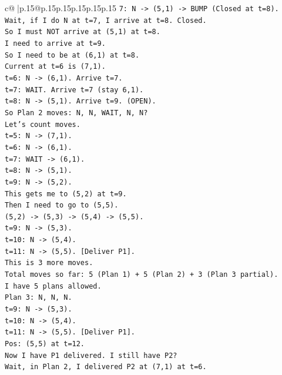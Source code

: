 \documentclass{article}
\begin{document}
{\begin{supertabular}{c@{$\;$}|p{.15\linewidth}@{}p{.15\linewidth}p{.15\linewidth}p{.15\linewidth}p{.15\linewidth}p{.15\linewidth}}
{{{\texttt{7: N {-}> (5,1) {-}> BUMP (Closed at t=8).} \\
\texttt{Wait, if I do N at t=7, I arrive at t=8. Closed.} \\
\texttt{So I must NOT arrive at (5,1) at t=8.} \\
\texttt{I need to arrive at t=9.} \\
\texttt{So I need to be at (6,1) at t=8.} \\
\texttt{Current at t=6 is (7,1).} \\
\texttt{t=6: N {-}> (6,1). Arrive t=7.} \\
\texttt{t=7: WAIT. Arrive t=7 (stay 6,1).} \\
\texttt{t=8: N {-}> (5,1). Arrive t=9. (OPEN).} \\
\texttt{So Plan 2 moves: N, N, WAIT, N, N?} \\
\texttt{Let's count moves.} \\
\texttt{t=5: N {-}> (7,1).} \\
\texttt{t=6: N {-}> (6,1).} \\
\texttt{t=7: WAIT {-}> (6,1).} \\
\texttt{t=8: N {-}> (5,1).} \\
\texttt{t=9: N {-}> (5,2).} \\
\texttt{This gets me to (5,2) at t=9.} \\
\texttt{Then I need to go to (5,5).} \\
\texttt{(5,2) {-}> (5,3) {-}> (5,4) {-}> (5,5).} \\
\texttt{t=9: N {-}> (5,3).} \\
\texttt{t=10: N {-}> (5,4).} \\
\texttt{t=11: N {-}> (5,5). {[}Deliver P1{]}.} \\
\texttt{This is 3 more moves.} \\
\texttt{Total moves so far: 5 (Plan 1) + 5 (Plan 2) + 3 (Plan 3 partial).} \\
\texttt{I have 5 plans allowed.} \\
\texttt{Plan 3: N, N, N.} \\
\texttt{t=9: N {-}> (5,3).} \\
\texttt{t=10: N {-}> (5,4).} \\
\texttt{t=11: N {-}> (5,5). {[}Deliver P1{]}.} \\
\texttt{Pos: (5,5) at t=12.} \\
\texttt{Now I have P1 delivered. I still have P2?} \\
\texttt{Wait, in Plan 2, I delivered P2 at (7,1) at t=6.} \\
}}}
\end{supertabular}}
\end{document}
